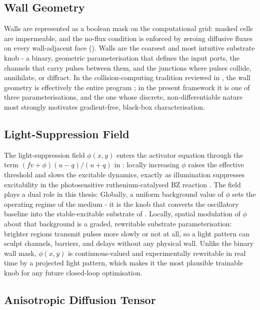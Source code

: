 \subsection{Wall Geometry}
\label{sec:meth_walls}

Walls are represented as a boolean mask on the computational grid: masked cells are impermeable, and the no-flux condition is enforced by zeroing diffusive fluxes on every wall-adjacent face (). 
Walls are the coarsest and most intuitive substrate knob - a binary, geometric parameterisation that defines the input ports, the channels that carry pulses between them, and the junctions where pulses collide, annihilate, or diffract. 
In the collision-computing tradition reviewed in , the wall geometry is effectively the entire program \cite{toth1995logic, adamatzky2002xor}; in the present framework it is one of three parameterisations, and the one whose discrete, non-differentiable nature most strongly motivates gradient-free, black-box characterisation.

\subsection{Light-Suppression Field}
\label{sec:meth_light}

The light-suppression field $\phi(x,y)$ enters the activator equation through the term $(f v + \phi)(u-q)/(u+q)$ in : locally increasing $\phi$ raises the effective threshold and slows the excitable dynamics, exactly as illumination suppresses excitability in the photosensitive ruthenium-catalysed BZ reaction \cite{sakurai2002design}. 
The field plays a dual role in this thesis: 
Globally, a uniform background value of $\phi$ sets the operating regime of the medium - it is the knob that converts the oscillatory baseline into the stable-excitable substrate of . 
Locally, spatial modulation of $\phi$ about that background is a graded, rewritable substrate parameterisation: brighter regions transmit pulses more slowly or not at all, so a light pattern can sculpt channels, barriers, and delays without any physical wall. 
Unlike the binary wall mask, $\phi(x,y)$ is continuous-valued and experimentally rewritable in real time by a projected light pattern, which makes it the most plausible trainable knob for any future closed-loop optimisation.

\subsection{Anisotropic Diffusion Tensor}
\label{sec:meth_anisotropy}

